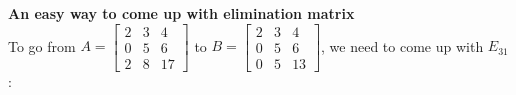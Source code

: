 \begin{mdframed}
    \textbf{An easy way to come up with elimination matrix} \\

    \noindent To go from $A =
        \begin{bmatrix}
            2 & 3 & 4  \\
            0 & 5 & 6  \\
            2 & 8 & 17
        \end{bmatrix}$ to $B =
        \begin{bmatrix}
            2 & 3 & 4  \\
            0 & 5 & 6  \\
            0 & 5 & 13
        \end{bmatrix}$, we need to come up with $E_{31}$: \\


\end{mdframed}
